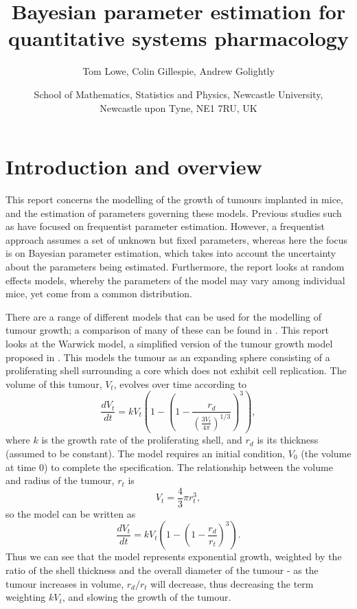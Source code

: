 \documentclass[11pt,a4paper]{article}
\title{Bayesian parameter estimation for quantitative
systems pharmacology}
\author{Tom Lowe, Colin Gillespie, Andrew Golightly}
\date{School of Mathematics, Statistics and Physics, Newcastle University,\\
  Newcastle upon Tyne, NE1 7RU, UK}
\begin{document}
\maketitle

\section{Introduction and overview}
\label{sec:intro}

This report concerns the modelling of the growth of tumours implanted in mice, and the estimation of parameters governing these models. Previous studies such as \cite{yates14} have focused on frequentist parameter estimation. However, a frequentist approach assumes a set of unknown but fixed parameters, whereas here the focus is on Bayesian parameter estimation, which takes into account the uncertainty about the parameters being estimated. Furthermore, the report looks at random effects models, whereby the parameters of the model may vary among individual mice, yet come from a common distribution.

There are a range of different models that can be used for the modelling of tumour growth; a comparison of many of these can be found in \cite{evans17}. This report looks at the Warwick model, a simplified version of the tumour growth model proposed in \cite{yates14}. This models the tumour as an expanding sphere consisting of a proliferating shell surrounding a core which does not exhibit cell replication. The volume of this tumour, $V_t$, evolves over time according to 
\[
\frac{dV_t}{dt} = kV_t\left(1-\left(1-\frac{r_d}{\left(\frac{3V_t}{4 \pi} \right)^{1/3}}\right)^3\right),
\]
where $k$ is the growth rate of the proliferating shell, and $r_d$ is its thickness (assumed to be constant). The model requires an initial condition, $V_0$ (the volume at time 0) to complete the specification. The relationship between the volume and radius of the tumour, $r_t$ is
\[
V_t = \frac{4}{3} \pi r_t^3,
\]
so the model can be written as
\[
\frac{dV_t}{dt} = kV_t\left(1-\left(1-\frac{r_d}{r_t}\right)^3\right).
\]
Thus we can see that the model represents exponential growth, weighted by the ratio of the shell thickness and the overall diameter of the tumour - as the tumour increases in volume, $r_d/r_t$ will decrease, thus decreasing the term weighting $kV_t$, and slowing the growth of the tumour. 
\end{document}
